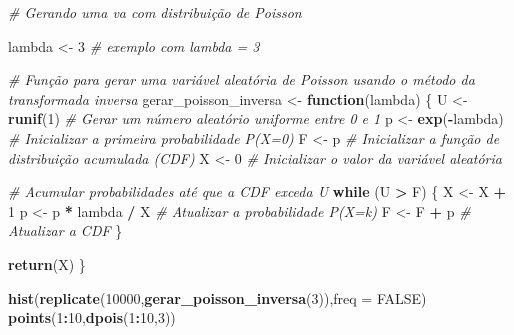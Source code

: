 \documentclass[
]{book}
\newenvironment{Shaded}{\begin{snugshade}}{\end{snugshade}}
\newcommand{\AttributeTok}[1]{\textcolor[rgb]{0.13,0.29,0.53}{#1}}
\newcommand{\CommentTok}[1]{\textcolor[rgb]{0.56,0.35,0.01}{\textit{#1}}}
\newcommand{\ConstantTok}[1]{\textcolor[rgb]{0.56,0.35,0.01}{#1}}
\newcommand{\ControlFlowTok}[1]{\textcolor[rgb]{0.13,0.29,0.53}{\textbf{#1}}}
\newcommand{\DecValTok}[1]{\textcolor[rgb]{0.00,0.00,0.81}{#1}}
\newcommand{\FunctionTok}[1]{\textcolor[rgb]{0.13,0.29,0.53}{\textbf{#1}}}
\newcommand{\NormalTok}[1]{#1}
\newcommand{\OtherTok}[1]{\textcolor[rgb]{0.56,0.35,0.01}{#1}}
\newcommand{\SpecialCharTok}[1]{\textcolor[rgb]{0.81,0.36,0.00}{\textbf{#1}}}
\begin{document}
\begin{Shaded}
\begin{Highlighting}[]
\CommentTok{\# Gerando uma va com distribuição de Poisson}

\NormalTok{lambda }\OtherTok{\textless{}{-}} \DecValTok{3}  \CommentTok{\# exemplo com lambda = 3}

\CommentTok{\# Função para gerar uma variável aleatória de Poisson usando o método da transformada inversa}
\NormalTok{gerar\_poisson\_inversa }\OtherTok{\textless{}{-}} \ControlFlowTok{function}\NormalTok{(lambda) \{}
\NormalTok{  U }\OtherTok{\textless{}{-}} \FunctionTok{runif}\NormalTok{(}\DecValTok{1}\NormalTok{)  }\CommentTok{\# Gerar um número aleatório uniforme entre 0 e 1}
\NormalTok{  p }\OtherTok{\textless{}{-}} \FunctionTok{exp}\NormalTok{(}\SpecialCharTok{{-}}\NormalTok{lambda)  }\CommentTok{\# Inicializar a primeira probabilidade P(X=0)}
\NormalTok{  F }\OtherTok{\textless{}{-}}\NormalTok{ p  }\CommentTok{\# Inicializar a função de distribuição acumulada (CDF)}
\NormalTok{  X }\OtherTok{\textless{}{-}} \DecValTok{0}  \CommentTok{\# Inicializar o valor da variável aleatória}
  
  \CommentTok{\# Acumular probabilidades até que a CDF exceda U}
  \ControlFlowTok{while}\NormalTok{ (U }\SpecialCharTok{\textgreater{}}\NormalTok{ F) \{}
\NormalTok{    X }\OtherTok{\textless{}{-}}\NormalTok{ X }\SpecialCharTok{+} \DecValTok{1}
\NormalTok{    p }\OtherTok{\textless{}{-}}\NormalTok{ p }\SpecialCharTok{*}\NormalTok{ lambda }\SpecialCharTok{/}\NormalTok{ X  }\CommentTok{\# Atualizar a probabilidade P(X=k)}
\NormalTok{    F }\OtherTok{\textless{}{-}}\NormalTok{ F }\SpecialCharTok{+}\NormalTok{ p  }\CommentTok{\# Atualizar a CDF}
\NormalTok{  \}}
  
  \FunctionTok{return}\NormalTok{(X)}
\NormalTok{\}}

\FunctionTok{hist}\NormalTok{(}\FunctionTok{replicate}\NormalTok{(}\DecValTok{10000}\NormalTok{,}\FunctionTok{gerar\_poisson\_inversa}\NormalTok{(}\DecValTok{3}\NormalTok{)),}\AttributeTok{freq =} \ConstantTok{FALSE}\NormalTok{)}
\FunctionTok{points}\NormalTok{(}\DecValTok{1}\SpecialCharTok{:}\DecValTok{10}\NormalTok{,}\FunctionTok{dpois}\NormalTok{(}\DecValTok{1}\SpecialCharTok{:}\DecValTok{10}\NormalTok{,}\DecValTok{3}\NormalTok{))}
\end{Highlighting}
\end{Shaded}
\end{document}
